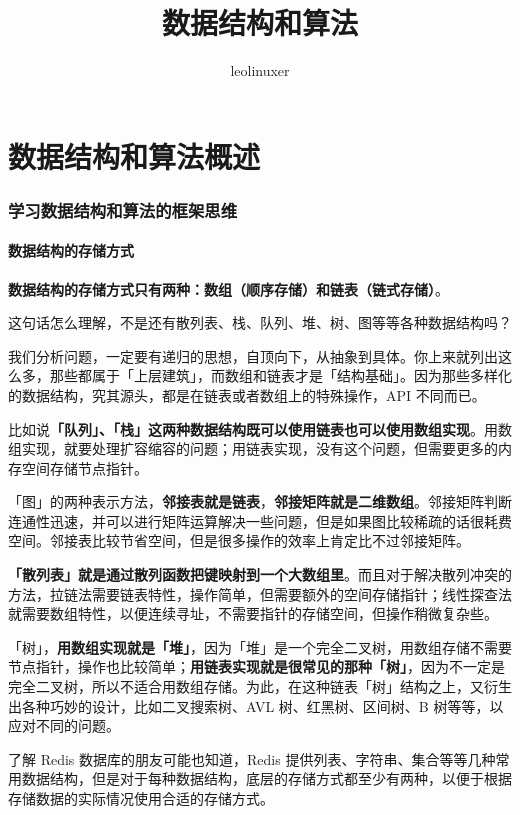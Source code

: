 \documentclass[12pt]{article}
\title{数据结构和算法}
\author{leolinuxer}
\begin{document}
\maketitle
\tableofcontents

\part{数据结构和算法概述}
\section{学习数据结构和算法的框架思维\cite{F_Algorithm_Mind_Framework}}
\subsection{数据结构的存储方式}
\textbf{数据结构的存储方式只有两种：数组（顺序存储）和链表（链式存储）}。

这句话怎么理解，不是还有散列表、栈、队列、堆、树、图等等各种数据结构吗？

我们分析问题，一定要有递归的思想，自顶向下，从抽象到具体。你上来就列出这么多，那些都属于「上层建筑」，而数组和链表才是「结构基础」。因为那些多样化的数据结构，究其源头，都是在链表或者数组上的特殊操作，API 不同而已。

比如说\textbf{「队列」、「栈」这两种数据结构既可以使用链表也可以使用数组实现}。用数组实现，就要处理扩容缩容的问题；用链表实现，没有这个问题，但需要更多的内存空间存储节点指针。

「图」的两种表示方法，\textbf{邻接表就是链表}，\textbf{邻接矩阵就是二维数组}。邻接矩阵判断连通性迅速，并可以进行矩阵运算解决一些问题，但是如果图比较稀疏的话很耗费空间。邻接表比较节省空间，但是很多操作的效率上肯定比不过邻接矩阵。

\textbf{「散列表」就是通过散列函数把键映射到一个大数组里}。而且对于解决散列冲突的方法，拉链法需要链表特性，操作简单，但需要额外的空间存储指针；线性探查法就需要数组特性，以便连续寻址，不需要指针的存储空间，但操作稍微复杂些。

「树」，\textbf{用数组实现就是「堆」}，因为「堆」是一个完全二叉树，用数组存储不需要节点指针，操作也比较简单；\textbf{用链表实现就是很常见的那种「树」}，因为不一定是完全二叉树，所以不适合用数组存储。为此，在这种链表「树」结构之上，又衍生出各种巧妙的设计，比如二叉搜索树、AVL 树、红黑树、区间树、B 树等等，以应对不同的问题。

了解 Redis 数据库的朋友可能也知道，Redis 提供列表、字符串、集合等等几种常用数据结构，但是对于每种数据结构，底层的存储方式都至少有两种，以便于根据存储数据的实际情况使用合适的存储方式。
\end{document}
